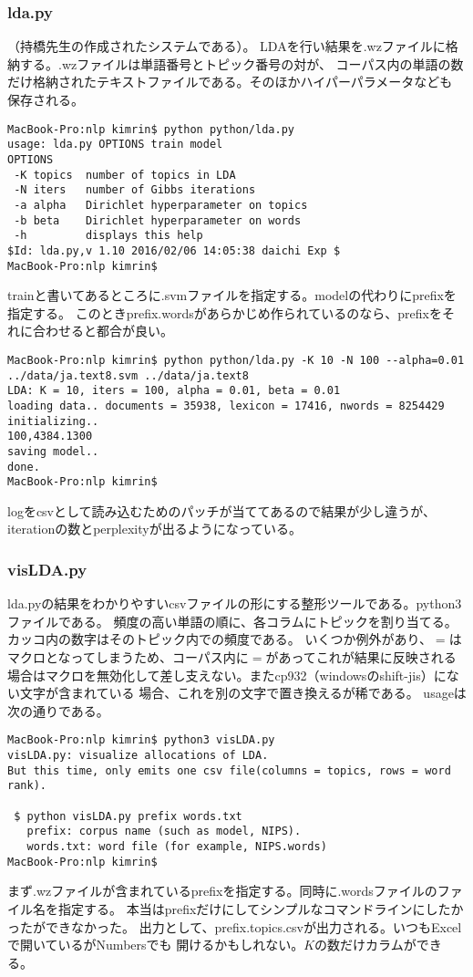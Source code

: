 \documentclass[uplatex]{jsarticle}
\begin{document}
\subsubsection{lda.py}
（持橋先生の作成されたシステムである）。
LDAを行い結果を.wzファイルに格納する。.wzファイルは単語番号とトピック番号の対が、
コーパス内の単語の数だけ格納されたテキストファイルである。そのほかハイパーパラメータなども
保存される。
\begin{lstlisting}
MacBook-Pro:nlp kimrin$ python python/lda.py
usage: lda.py OPTIONS train model
OPTIONS
 -K topics  number of topics in LDA
 -N iters   number of Gibbs iterations
 -a alpha   Dirichlet hyperparameter on topics
 -b beta    Dirichlet hyperparameter on words
 -h         displays this help
$Id: lda.py,v 1.10 2016/02/06 14:05:38 daichi Exp $
MacBook-Pro:nlp kimrin$
\end{lstlisting}
trainと書いてあるところに.svmファイルを指定する。modelの代わりにprefixを指定する。
このときprefix.wordsがあらかじめ作られているのなら、prefixをそれに合わせると都合が良い。

\begin{lstlisting}
MacBook-Pro:nlp kimrin$ python python/lda.py -K 10 -N 100 --alpha=0.01 ../data/ja.text8.svm ../data/ja.text8
LDA: K = 10, iters = 100, alpha = 0.01, beta = 0.01
loading data.. documents = 35938, lexicon = 17416, nwords = 8254429
initializing..
100,4384.1300
saving model..
done.
MacBook-Pro:nlp kimrin$
\end{lstlisting}

logをcsvとして読み込むためのパッチが当ててあるので結果が少し違うが、
iterationの数とperplexityが出るようになっている。

\subsubsection{visLDA.py}
lda.pyの結果をわかりやすいcsvファイルの形にする整形ツールである。python3ファイルである。
頻度の高い単語の順に、各コラムにトピックを割り当てる。カッコ内の数字はそのトピック内での頻度である。
いくつか例外があり、$=$はマクロとなってしまうため、コーパス内に$=$があってこれが結果に反映される
場合はマクロを無効化して差し支えない。またcp932（windowsのshift-jis）にない文字が含まれている
場合、これを別の文字で置き換えるが稀である。
usageは次の通りである。

\begin{lstlisting}
MacBook-Pro:nlp kimrin$ python3 visLDA.py
visLDA.py: visualize allocations of LDA.
But this time, only emits one csv file(columns = topics, rows = word rank).

 $ python visLDA.py prefix words.txt
   prefix: corpus name (such as model, NIPS).
   words.txt: word file (for example, NIPS.words)
MacBook-Pro:nlp kimrin$
\end{lstlisting}
まず.wzファイルが含まれているprefixを指定する。同時に.wordsファイルのファイル名を指定する。
本当はprefixだけにしてシンプルなコマンドラインにしたかったができなかった。
出力として、prefix.topics.csvが出力される。いつもExcelで開いているがNumbersでも
開けるかもしれない。$K$の数だけカラムができる。
\end{document}
